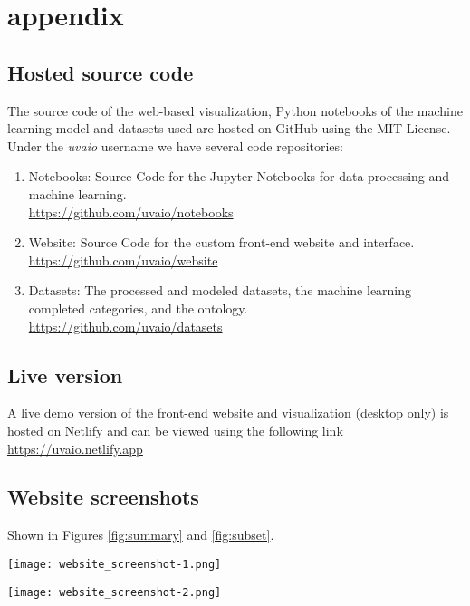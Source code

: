 \section{appendix}

\subsection{Hosted source code}

The source code of the web-based visualization, Python notebooks of the machine learning model and datasets used are hosted on GitHub using the MIT License. Under the \textit{uvaio} username we have several code repositories:

\begin{enumerate}
  \item Notebooks: Source Code for the Jupyter Notebooks for data processing and machine learning. \\ \underline{https://github.com/uvaio/notebooks}
  \item Website: Source Code for the custom front-end website and interface. \underline{https://github.com/uvaio/website}
  \item Datasets: The processed and modeled datasets, the machine learning completed categories, and the ontology. \\ \underline{https://github.com/uvaio/datasets}
\end{enumerate}

\subsection{Live version}
A live demo version of the front-end website and visualization (desktop only) is hosted on Netlify and can be viewed using the following link \underline{https://uvaio.netlify.app}


\subsection{Website screenshots}

Shown in Figures \ref{fig:summary} and \ref{fig:subset}.


 \begin{figure*}[!]
    \centering
    \texttt{[image: website\_screenshot-1.png]}
    \caption{Screenshot of the 'overview landing page' of the  website}
    \label{fig:summary}
\end{figure*}

 \begin{figure*}[!]
    \centering
    \texttt{[image: website\_screenshot-2.png]}
    \caption{Screenshot of the detail 'create a subset' page of the website}
    \label{fig:subset}
\end{figure*}

